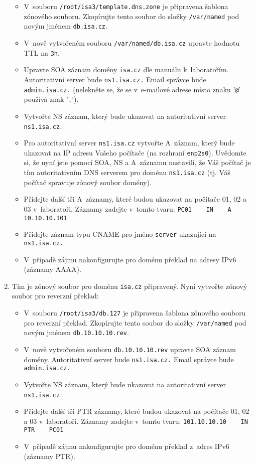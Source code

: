 \begin{enumerate}
    \begin{itemize}
      \item V~souboru {\tt /root/isa3/template.dns.zone} je připravena šablona zónového souboru.
            Zkopírujte tento soubor do složky {\tt /var/named} pod novým jménem {\tt db.isa.cz}.
      \item V~nově vytvořeném souboru {\tt /var/named/db.isa.cz} upravte hodnotu TTL na {\tt 3h}.
      \item Upravte SOA záznam domény {\tt isa.cz} dle manuálu k~laboratořím. Autoritativní server bude {\tt ns1.isa.cz.}
            Email správce bude {\tt admin.isa.cz.} (nelekněte se, že se v~e-mailové adrese místo znaku '{\tt @}' používá znak '{\tt .}').
      \item Vytvořte NS záznam, který bude ukazovat na autoritativní server {\tt ns1.isa.cz}.
      \item Pro autoritativní server {\tt ns1.isa.cz} vytvořte A~záznam, který bude ukazovat na IP adresu Vašeho počítače (na rozhraní {\tt enp2s0}).
            Uvědomte si, že nyní jste pomocí SOA, NS a A~záznamu nastavili, že Váš počítač je tím autoritativním DNS serverem pro doménu {\tt ns1.isa.cz} (tj. Váš počítač spravuje zónový soubor domény).
      \item Přidejte další tři A~záznamy, které budou ukazovat na počítače 01, 02 a 03 v~laboratoři. Záznamy zadejte v~tomto tvaru:
            \verb|PC01    IN    A    10.10.10.101|
      \item Přidejte záznam typu CNAME pro jméno {\tt server} ukazující na {\tt ns1.isa.cz.}
      \item V~případě zájmu nakonfigurujte pro doménu překlad na adresy IPv6 (záznamy AAAA).
    \end{itemize}
    
  \item Tím je zónový soubor pro doménu {\tt isa.cz} připravený. Nyní vytvořte zónový soubor pro reverzní překlad:
  
    \begin{itemize}
      \item V~souboru {\tt /root/isa3/db.127} je připravena šablona zónového souboru pro reverzní překlad.
            Zkopírujte tento soubor do složky {\tt /var/named} pod novým jménem {\tt db.10.10.10.rev}.
      \item V~nově vytvořeném souboru {\tt db.10.10.10.rev} upravte SOA záznam domény. Autoritativní server bude {\tt ns1.isa.cz.}
            Email správce bude {\tt admin.isa.cz.}
      \item Vytvořte NS záznam, který bude ukazovat na autoritativní server {\tt ns1.isa.cz}.
      \item Přidejte další tři PTR záznamy, které budou ukazovat na počítače 01, 02 a 03 v~laboratoři. Záznamy zadejte v~tomto tvaru:
            \verb|101.10.10.10    IN    PTR    PC01|
      \item V~případě zájmu nakonfigurujte pro doménu překlad z~adres IPv6 (záznamy PTR).
    \end{itemize} 
    

\end{enumerate}
